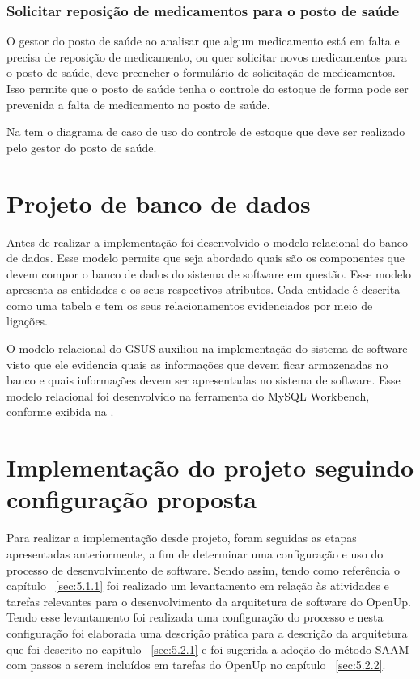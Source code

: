 \subsubsection{Solicitar reposição de medicamentos para o posto de saúde}

O gestor do posto de saúde ao analisar que algum medicamento está em falta e precisa de reposição de medicamento, ou quer solicitar novos medicamentos para o posto de saúde, deve preencher o formulário de solicitação de medicamentos. Isso permite que o posto de saúde tenha o controle do estoque de forma pode ser prevenida a falta de medicamento no posto de saúde.

Na  tem o diagrama de caso de uso do controle de estoque que deve ser realizado pelo gestor do posto de saúde.

%

\section{Projeto de banco de dados}

Antes de realizar a implementação foi desenvolvido o modelo relacional do banco de dados. Esse modelo permite que seja abordado quais são os componentes que devem compor o banco de dados do sistema de software em questão. Esse modelo apresenta as entidades e os seus respectivos atributos. Cada entidade é descrita como uma tabela e tem os seus relacionamentos evidenciados por meio de ligações.

O modelo relacional do GSUS auxiliou na implementação do sistema de software visto que ele evidencia quais as informações que devem ficar armazenadas no banco e quais informações devem ser apresentadas no sistema de software. Esse modelo relacional foi desenvolvido na ferramenta do MySQL Workbench, conforme exibida na .


%



\section{Implementação do projeto seguindo configuração proposta}
\label{sec:implementação}
Para realizar a implementação desde projeto, foram seguidas as etapas apresentadas anteriormente, a fim de determinar uma configuração e uso do processo de desenvolvimento de software.
Sendo assim, tendo como referência o capítulo  ~\ref{sec:5.1.1} foi realizado um levantamento em relação às atividades e tarefas relevantes para o desenvolvimento da arquitetura de software do \acrfull{OpenUp}. Tendo esse levantamento foi realizada uma configuração do processo e nesta configuração foi elaborada uma descrição prática para a descrição da arquitetura que foi descrito no capítulo ~\ref{sec:5.2.1} e foi sugerida a adoção do método \acrfull{SAAM} com passos a serem incluídos em tarefas do \acrfull{OpenUp} no capítulo ~\ref{sec:5.2.2}. 

